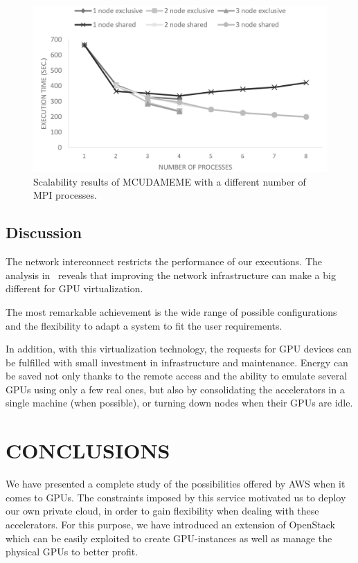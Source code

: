 \documentclass[a4paper,twoside]{article}
\begin{document}
\begin{figure}[htb]
  \centering
  \includegraphics[width=\linewidth]{images/mcudameme-os.pdf}
  \caption{Scalability results of MCUDAMEME with a different number of MPI processes.}
  \label{fig3}
\end{figure}

\subsection{Discussion}
The network interconnect restricts the performance of our executions.
The analysis in~\cite{tonithesis} reveals that improving the network infrastructure can make a big different for GPU virtualization.

The most remarkable achievement is the wide range of possible configurations and the flexibility to adapt a system to fit the user requirements. 

In addition, with this virtualization technology, the requests for GPU devices can be fulfilled with small investment in infrastructure and maintenance.
Energy can be saved not only thanks to the remote access and the ability to emulate several GPUs using only a few real ones, but also by consolidating the accelerators in a single machine (when possible), or turning down nodes when their GPUs are idle. 

\section{\uppercase{Conclusions}}
\label{sec:conclusions}
We have presented a complete study of the possibilities offered by AWS when it comes to GPUs. 
The constraints imposed by this service motivated us to deploy our own private cloud, in order to gain flexibility when dealing with these accelerators.
For this purpose, we have introduced an extension of OpenStack which can be easily exploited to create GPU-instances as well as manage the physical GPUs to better profit.
\end{document}
